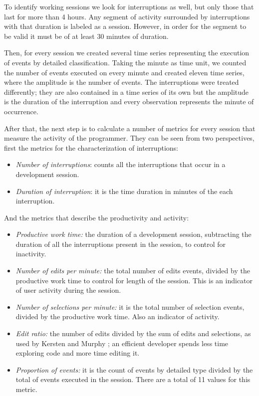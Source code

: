 To identify working sessions we look for interruptions as well, but only those that last for more than 4 hours. Any segment of activity surrounded by interruptions with that duration is labeled as a session. However, in order for the segment to be valid it must be of at least 30 minutes of duration.

Then, for every session we created several time series representing the execution of events by detailed classification. Taking the minute as time unit, we counted the number of events executed on every minute and created eleven time series, where the amplitude is the number of events. The interruptions were treated differently; they are also contained in a time series of its own but the amplitude is the duration of the interruption and every observation represents the minute of occurrence. 

After that, the next step is to calculate a number of metrics for every session that measure the activity of the programmer. They can be seen from two perspectives, first the metrics for the characterization of interruptions:
\begin{itemize}
	\item \textit{Number of interruptions}:  counts all the interruptions that occur in a development session.
	\item \textit{Duration of interruption}:  it is the time duration in minutes of the each interruption. 
\end{itemize}

And the metrics that describe the productivity and activity:
\begin{itemize}
	\item \textit{Productive work time:} the duration of a development session, subtracting the duration of all the interruptions present in the session, to control for inactivity.
	\item \textit{Number of edits per minute:} the total number of edits events, divided by the productive work time to control for length of the session. This is an indicator of user activity during the session.
	\item \textit{Number of selections per minute:} it is the total number of selection events, divided by the productive work time. Also an indicator of activity.
	\item \textit{Edit ratio:} the number of edits divided by the sum of edits and selections, as used by Kersten and Murphy \cite{KM06}; an efficient developer spends less time exploring code and more time editing it.
	\item \textit{Proportion of events:} it is the count of events by detailed type divided by the total of events executed in the session. There are a total of 11 values for this metric.
\end{itemize} 


